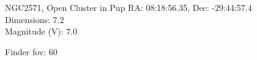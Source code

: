 \begin{block}{NGC2571, Open Cluster in Pup}
    RA: 08:18:56.35, Dec: -29:44:57.4 \\ 
    Dimensions: 7.2 \\ 
    Magnitude (V): 7.0



    Finder fov: 60 

     
\end{block}